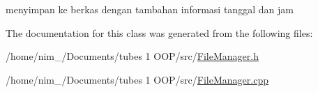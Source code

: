 menyimpan ke berkas dengan tambahan informasi tanggal dan jam 



The documentation for this class was generated from the following files\-:\begin{DoxyCompactItemize}
\item 
/home/nim\-\_/\-Documents/tubes 1 O\-O\-P/src/\hyperlink{_file_manager_8h}{File\-Manager.\-h}\item 
/home/nim\-\_/\-Documents/tubes 1 O\-O\-P/src/\hyperlink{_file_manager_8cpp}{File\-Manager.\-cpp}\end{DoxyCompactItemize}
